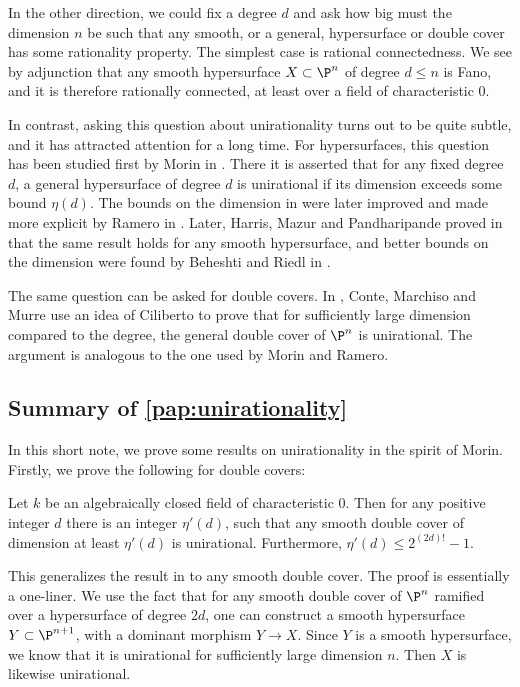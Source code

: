 In the other direction, we could fix a degree $d$ and ask how big must the dimension $n$ be such that any smooth, or a general, hypersurface or double cover has some rationality property. The simplest case is rational connectedness. We see by adjunction that any smooth hypersurface $X \subset \P^n$ of degree $d \leq n$ is Fano, and it is therefore rationally connected, at least over a field of characteristic 0.

In contrast, asking this question about unirationality turns out to be quite subtle, and it has attracted attention for a long time. For hypersurfaces, this question has been studied first by Morin in \cite{MorinUnirationality}. There it is asserted that for any fixed degree $d$, a general hypersurface of degree $d$ is unirational if its dimension exceeds some bound $\eta(d)$. The bounds on the dimension in \cite{MorinUnirationality} were later improved and made more explicit by Ramero in \cite{Ramero}. Later, Harris, Mazur and Pandharipande proved in \cite{HMPUnirationality} that the same result holds for any smooth hypersurface, and better bounds on the dimension were found by Beheshti and Riedl in \cite[Corollary 4.6]{BRHypersurface}.

The same question can be asked for double covers. In \cite{CMMDoubleCover}, Conte, Marchiso and Murre use an idea of Ciliberto to prove that for sufficiently large dimension compared to the degree, the general double cover of $\P^n$ is unirational. The argument is analogous to the one used by Morin and Ramero.

\subsection{Summary of \cref{pap:unirationality}}
In this short note, we prove some results on unirationality in the spirit of Morin. Firstly, we prove the following for double covers:
\begin{theorem}
	Let $k$ be an algebraically closed field of characteristic 0. Then for any positive integer $d$ there is an integer $\eta'(d)$, such that any smooth double cover of dimension at least $\eta'(d)$ is unirational. Furthermore, $\eta'(d) \leq 2^{(2d)!} - 1$.
\end{theorem}
This generalizes the result in \cite{CMMDoubleCover} to any smooth double cover. The proof is essentially a one-liner. We use the fact that for any smooth double cover of $\P^n$ ramified over a hypersurface of degree $2d$, one can construct a smooth hypersurface $Y \subset \P^{n+1}$, with a dominant morphism $Y \to X$. Since $Y$ is a smooth hypersurface, we know that it is unirational for sufficiently large dimension $n$. Then $X$ is likewise unirational.

